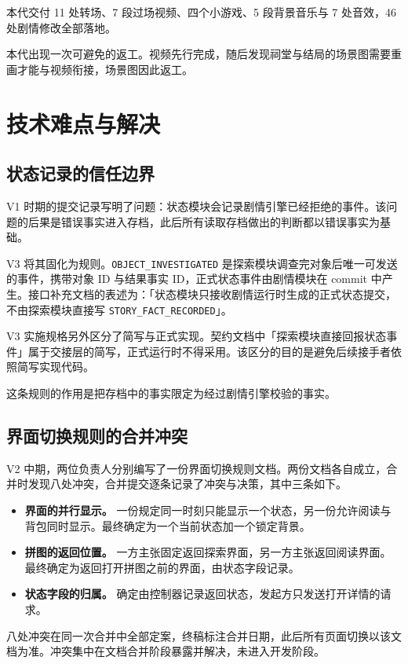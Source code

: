 本代交付 11 处转场、7 段过场视频、四个小游戏、5 段背景音乐与 7 处音效，46 处剧情修改全部落地。

本代出现一次可避免的返工。视频先行完成，随后发现祠堂与结局的场景图需要重画才能与视频衔接，场景图因此返工。

\section{技术难点与解决}

\subsection{状态记录的信任边界}

V1 时期的提交记录写明了问题：状态模块会记录剧情引擎已经拒绝的事件。该问题的后果是错误事实进入存档，此后所有读取存档做出的判断都以错误事实为基础。

V3 将其固化为规则。\texttt{OBJECT\_INVESTIGATED} 是探索模块调查完对象后唯一可发送的事件，携带对象 ID 与结果事实 ID，正式状态事件由剧情模块在 commit 中产生。接口补充文档的表述为：「状态模块只接收剧情运行时生成的正式状态提交，不由探索模块直接写 \texttt{STORY\_FACT\_RECORDED}」。

V3 实施规格另外区分了简写与正式实现。契约文档中「探索模块直接回报状态事件」属于交接层的简写，正式运行时不得采用。该区分的目的是避免后续接手者依照简写实现代码。

这条规则的作用是把存档中的事实限定为经过剧情引擎校验的事实。

\subsection{界面切换规则的合并冲突}

V2 中期，两位负责人分别编写了一份界面切换规则文档。两份文档各自成立，合并时发现八处冲突，合并提交逐条记录了冲突与决策，其中三条如下。

\begin{itemize}
  \item \textbf{界面的并行显示。} 一份规定同一时刻只能显示一个状态，另一份允许阅读与背包同时显示。最终确定为一个当前状态加一个锁定背景。
  \item \textbf{拼图的返回位置。} 一方主张固定返回探索界面，另一方主张返回阅读界面。最终确定为返回打开拼图之前的界面，由状态字段记录。
  \item \textbf{状态字段的归属。} 确定由控制器记录返回状态，发起方只发送打开详情的请求。
\end{itemize}

八处冲突在同一次合并中全部定案，终稿标注合并日期，此后所有页面切换以该文档为准。冲突集中在文档合并阶段暴露并解决，未进入开发阶段。

